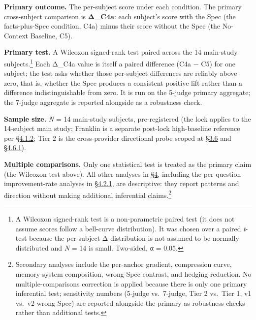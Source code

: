 \textbf{Primary outcome.} The per-subject score under each condition.
The primary cross-subject comparison is \textbf{Δ\_C4a}: each subject's
score with the Spec (the facts-plus-Spec condition, C4a) minus their
score without the Spec (the No-Context Baseline, C5).

\textbf{Primary test.} A Wilcoxon signed-rank test paired across the 14
main-study subjects.\footnote{A Wilcoxon signed-rank test is a
  non-parametric paired test (it does not assume scores follow a
  bell-curve distribution). It was chosen over a paired \emph{t}-test
  because the per-subject Δ distribution is not assumed to be normally
  distributed and \emph{N} = 14 is small. Two-sided, α = 0.05.} Each
Δ\_C4a value is itself a paired difference (C4a − C5) for one subject;
the test asks whether those per-subject differences are reliably above
zero, that is, whether the Spec produces a consistent positive lift
rather than a difference indistinguishable from zero. It is run on the
5-judge primary aggregate; the 7-judge aggregate is reported alongside
as a robustness check.

\textbf{Sample size.} \emph{N} = 14 main-study subjects, pre-registered
(the lock applies to the 14-subject main study; Franklin is a separate
post-lock high-baseline reference per \hyperref[the-gradient-at-the-high-baseline-end-franklin-reference]{§4.1.2}; Tier 2 is the
cross-provider directional probe scoped at \hyperref[response-models]{§3.6} and \hyperref[cross-provider-response-generation-tier-2-replication]{§4.6.1}).

\textbf{Multiple comparisons.} Only one statistical test is treated as
the primary claim (the Wilcoxon test above). All other analyses in \hyperref[results]{§4},
including the per-question improvement-rate analyses in \hyperref[per-question-improvement-rate]{§4.2.1}, are
descriptive: they report patterns and direction without making
additional inferential claims.\footnote{Secondary analyses include the
  per-anchor gradient, compression curve, memory-system composition,
  wrong-Spec contrast, and hedging reduction. No multiple-comparisons
  correction is applied because there is only one primary inferential
  test; sensitivity numbers (5-judge vs.~7-judge, Tier 2 vs.~Tier 1, v1
  vs.~v2 wrong-Spec) are reported alongside the primary as robustness
  checks rather than additional tests.}

